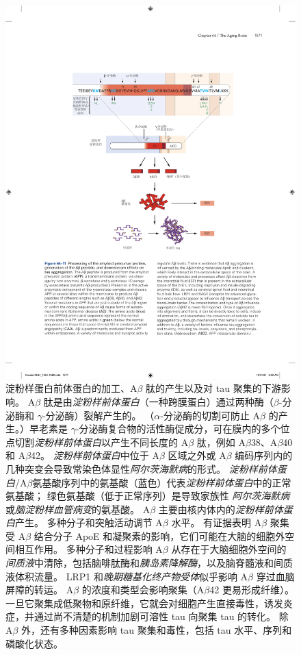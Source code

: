 \begin{figure}[htbp]
	\centering
	\includegraphics[width=0.85\linewidth]{chap64/fig_64_11}
	\caption{淀粉样蛋白前体蛋白的加工、A$\beta$ 肽的产生以及对 tau 聚集的下游影响。
		A$\beta$ 肽是由\textit{淀粉样前体蛋白}（一种跨膜蛋白）通过两种酶（$\beta$-分泌酶和 $\gamma$-分泌酶）裂解产生的。
		（$\alpha$-分泌酶的切割可防止 A$\beta$ 的产生。）早老素是 $\gamma$-分泌酶复合物的活性酶促成分，可在膜内的多个位点切割\textit{淀粉样前体蛋白}以产生不同长度的 A$\beta$ 肽，例如 A$\beta$38、A$\beta$40 和 A$\beta$42。
		\textit{淀粉样前体蛋白}中位于 A$\beta$ 区域之外或 A$\beta$ 编码序列内的几种突变会导致常染色体显性\textit{阿尔茨海默病}的形式。 
		\textit{淀粉样前体蛋白}/A$\beta$氨基酸序列中的氨基酸（蓝色）代表\textit{淀粉样前体蛋白}中的正常氨基酸；
		绿色氨基酸（低于正常序列）是导致家族性 \textit{阿尔茨海默病}或\textit{脑淀粉样血管病变}的氨基酸。
		A$\beta$ 主要由核内体内的\textit{淀粉样前体蛋白}产生。
		多种分子和突触活动调节 A$\beta$ 水平。
		有证据表明 A$\beta$ 聚集受 A$\beta$ 结合分子 ApoE 和凝聚素的影响，它们可能在大脑的细胞外空间相互作用。
		多种分子和过程影响 A$\beta$ 从存在于大脑细胞外空间的\textit{间质液}中清除，包括脑啡肽酶和\textit{胰岛素降解酶}，以及脑脊髓液和间质液体积流量。
		LRP1 和\textit{晚期糖基化终产物受体}似乎影响 A$\beta$ 穿过血脑屏障的转运。
		A$\beta$ 的浓度和类型会影响聚集（A$\beta$42 更易形成纤维）。
		一旦它聚集成低聚物和原纤维，它就会对细胞产生直接毒性，诱发炎症，并通过尚不清楚的机制加剧可溶性 tau 向聚集 tau 的转化。
		除 A$\beta$ 外，还有多种因素影响 tau 聚集和毒性，包括 tau 水平、序列和磷酸化状态。}
	\label{fig:64_11}
\end{figure}


